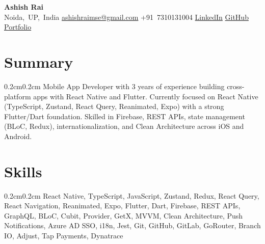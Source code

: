 \documentclass[10pt, letterpaper]{article}
\newenvironment{onecolentry}{\begin{adjustwidth}{0.2cm}{0.2cm}}{\end{adjustwidth}}
\newenvironment{header}{\setlength{\topsep}{0pt}\par\kern\topsep\centering}{\par\kern\topsep}
\begin{document}
\begin{header}
    \textbf{\fontsize{24pt}{24pt}\selectfont Ashish Rai} \\[0.2cm]

    \normalsize
    \mbox{{\color{black}\footnotesize\faMapMarker*}\hspace*{0.13cm}Noida, UP, India}%
    \kern 0.5cm
    \mbox{\href{mailto:ashishraimse@gmail.com}{\color{black}{\footnotesize\faEnvelope[regular]}\hspace*{0.13cm}ashishraimse@gmail.com}}%
    \kern 0.5cm
    \mbox{{\color{black}\footnotesize\faPhone*}\hspace*{0.13cm}+91 7310131004}%
    \kern 0.5cm
    \mbox{\href{https://www.linkedin.com/in/rai-ms}{\color{black}{\footnotesize\faLinkedinIn}\hspace*{0.13cm}LinkedIn}}%
    \kern 0.5cm
    \mbox{\href{https://github.com/rai-ms}{\color{black}{\footnotesize\faGithub}\hspace*{0.13cm}GitHub}}%
    \kern 0.5cm
    \mbox{\href{https://rx-project-75f17.web.app/}{\color{black}{\footnotesize\faGlobe}\hspace*{0.13cm}Portfolio}}%
\end{header}


\section{Summary}
\begin{onecolentry}
Mobile App Developer with 3 years of experience building cross-platform apps with React Native and Flutter. Currently focused on React Native (TypeScript, Zustand, React Query, Reanimated, Expo) with a strong Flutter/Dart foundation. Skilled in Firebase, REST APIs, state management (BLoC, Redux), internationalization, and Clean Architecture across iOS and Android.
\end{onecolentry}

\section{Skills}
\begin{onecolentry}
React Native, TypeScript, JavaScript, Zustand, Redux, React Query, React Navigation, Reanimated, Expo, Flutter, Dart, Firebase, REST APIs, GraphQL, BLoC, Cubit, Provider, GetX, MVVM, Clean Architecture, Push Notifications, Azure AD SSO, i18n, Jest, Git, GitHub, GitLab, GoRouter, Branch IO, Adjust, Tap Payments, Dynatrace
\end{onecolentry}
\end{document}
